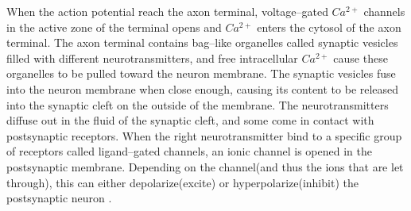 		When the action potential reach the axon terminal, voltage--gated $Ca^{2+}$ channels in the active zone of the terminal opens and $Ca^{2+}$ enters the cytosol of the axon terminal. %
		The axon terminal contains bag--like organelles called synaptic vesicles filled with different neurotransmitters, and free intracellular $Ca^{2+}$ cause these organelles to be pulled toward the neuron membrane.
		The synaptic vesicles fuse into the neuron membrane when close enough, causing its content to be released into the synaptic cleft on the outside of the membrane.
		The neurotransmitters diffuse out in the fluid of the synaptic cleft, and some come in contact with postsynaptic receptors. %
		When the right neurotransmitter bind to a specific group of receptors called ligand--gated channels, an ionic channel is opened in the postsynaptic membrane.
		Depending on the channel(and thus the ions that are let through), this can either depolarize(excite) or hyperpolarize(inhibit) the postsynaptic neuron %
		\cite{PrinciplesOfNeuralScience4edKAP10}.
		


